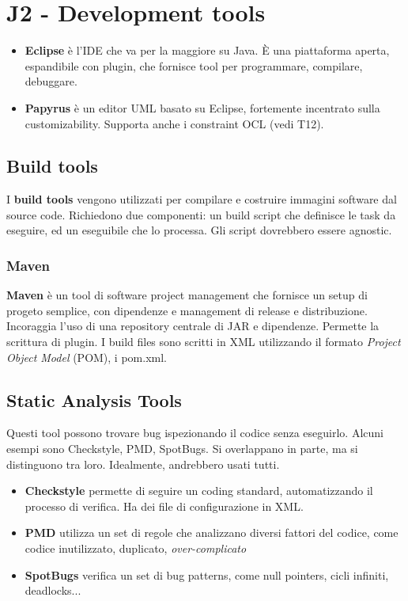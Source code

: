 \documentclass[11pt]{article}
\begin{document}
\section{J2 - Development tools}
\begin{itemize}
    \item \textbf{Eclipse} è l'IDE che va per la maggiore su Java. È una piattaforma aperta, espandibile con plugin, che fornisce tool per programmare, compilare, debuggare. 
    \item \textbf{Papyrus} è un editor UML basato su Eclipse, fortemente incentrato sulla customizability. Supporta anche i constraint OCL (vedi T12).
\end{itemize}
\subsection{Build tools}
I \textbf{build tools} vengono utilizzati per compilare e costruire immagini software dal source code. Richiedono due componenti: un build script che definisce le task da eseguire, ed un eseguibile che lo processa. Gli script dovrebbero essere \gls{agnostic}.
\subsubsection{Maven}
\textbf{Maven} è un tool di software project management che fornisce un setup di progeto semplice, con dipendenze e management di release e distribuzione. Incoraggia l'uso di una repository centrale di JAR e dipendenze. Permette la scrittura di plugin. I build files sono scritti in XML utilizzando il formato \textit{Project Object Model} (POM), i pom.xml.
\subsection{Static Analysis Tools}
Questi tool possono trovare bug ispezionando il codice senza eseguirlo. Alcuni esempi sono Checkstyle, PMD, SpotBugs. Si overlappano in parte, ma si distinguono tra loro. Idealmente, andrebbero usati tutti. 
\begin{itemize}
    \item \textbf{Checkstyle} permette di seguire un coding standard, automatizzando il processo di verifica. Ha dei file di configurazione in XML.
    \item \textbf{PMD} utilizza un set di regole che analizzano diversi fattori del codice, come codice inutilizzato, duplicato, \textit{over-complicato}
    \item  \textbf{SpotBugs} verifica un set di bug patterns, come null pointers, cicli infiniti, deadlocks...
\end{itemize}
\end{document}
